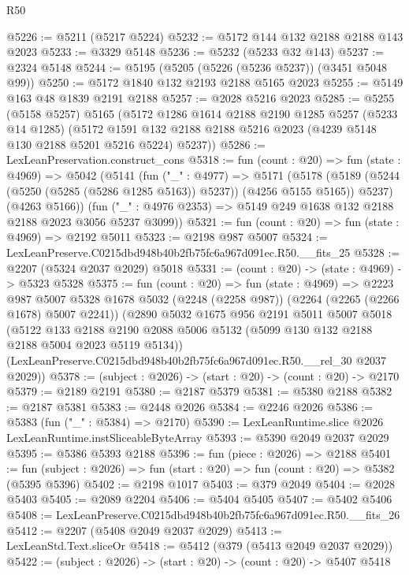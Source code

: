 \begin{lexlean}{R50}
\begin{coremodule}
@5226 := @5211 (@5217 @5224)
@5232 := @5172 @144 @132 @2188 @2188 @143 @2023
@5233 := @3329 @5148
@5236 := @5232 (@5233 @32 @143)
@5237 := @2324 @5148
@5244 := @5195 (@5205 (@5226 (@5236 @5237)) (@3451 @5048 @99))
@5250 := @5172 @1840 @132 @2193 @2188 @5165 @2023
@5255 := @5149 @163 @48 @1839 @2191 @2188
@5257 := @2028 @5216 @2023
@5285 := @5255
    (@5158 @5257)
    @5165
    (@5172
      @1286
      @1614
      @2188
      @2190
      @1285
      @5257
      (@5233 @14 @1285)
      (@5172 @1591 @132 @2188 @2188 @5216 @2023 (@4239 @5148 @130 @2188 @5201 @5216 @5224) @5237))
@5286 := LexLeanPreservation.construct_cons
@5318 := fun (count : @20) =>
  fun (state : @4969) =>
  @5042
    (@5141
      (fun ("_" : @4977) =>
      @5171
        (@5178 (@5189 (@5244 (@5250 (@5285 (@5286 @1285 @5163)) @5237)) (@4256 @5155 @5165)) @5237)
        (@4263 @5166))
      (fun ("_" : @4976 @2353) => @5149 @249 @1638 @132 @2188 @2188 @2023 @3056 @5237 @3099))
@5321 := fun (count : @20) => fun (state : @4969) => @2192 @5011
@5323 := @2198 @987 @5007
@5324 := LexLeanPreserve.C0215dbd948b40b2fb75fc6a967d091ec.R50.__fits_25
@5328 := @2207 (@5324 @2037 @2029) @5018
@5331 := (count : @20) -> (state : @4969) -> @5323 @5328
@5375 := fun (count : @20) =>
  fun (state : @4969) =>
  @2223
    @987
    @5007
    @5328
    @1678
    @5032
    (@2248 (@2258 @987))
    (@2264 (@2265 (@2266 @1678) @5007 @2241))
    (@2890
      @5032
      @1675
      @956
      @2191
      @5011
      @5007
      @5018
      (@5122
        @133
        @2188
        @2190
        @2088
        @5006
        @5132
        (@5099 @130 @132 @2188 @2188 @5004 @2023 @5119 @5134))
      (LexLeanPreserve.C0215dbd948b40b2fb75fc6a967d091ec.R50.__rel_30 @2037 @2029))
@5378 := (subject : @2026) -> (start : @20) -> (count : @20) -> @2170
@5379 := @2189 @2191
@5380 := @2187 @5379
@5381 := @5380 @2188
@5382 := @2187 @5381
@5383 := @2448 @2026
@5384 := @2246 @2026
@5386 := @5383 (fun ("_" : @5384) => @2170)
@5390 := LexLeanRuntime.slice @2026 LexLeanRuntime.instSliceableByteArray
@5393 := @5390 @2049 @2037 @2029
@5395 := @5386 @5393 @2188
@5396 := fun (piece : @2026) => @2188
@5401 := fun (subject : @2026) => fun (start : @20) => fun (count : @20) => @5382 (@5395 @5396)
@5402 := @2198 @1017
@5403 := @379 @2049
@5404 := @2028 @5403
@5405 := @2089 @2204
@5406 := @5404 @5405
@5407 := @5402 @5406
@5408 := LexLeanPreserve.C0215dbd948b40b2fb75fc6a967d091ec.R50.__fits_26
@5412 := @2207 (@5408 @2049 @2037 @2029)
@5413 := LexLeanStd.Text.sliceOr
@5418 := @5412 (@379 (@5413 @2049 @2037 @2029))
@5422 := (subject : @2026) -> (start : @20) -> (count : @20) -> @5407 @5418

\end{coremodule}
\end{lexlean}
